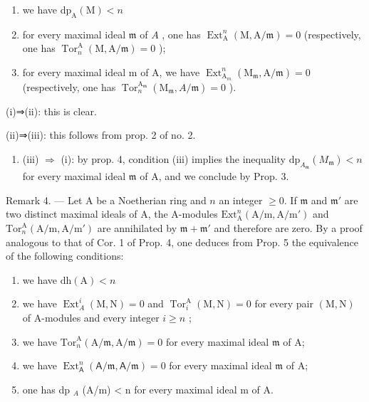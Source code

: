 \begin{enumerate}
\def\labelenumi{(\roman{enumi})}
\item
  we have \(\mathrm{dp}_{\mathrm{A}}(\mathrm{M}) < n\)
\item
  for every maximal ideal \(\mathfrak{m}\) of \(A\) , one has \(\operatorname{Ext}_{\mathrm{A}}^{n}(\mathrm{M},\mathrm{A}/\mathfrak{m}) = 0\) (respectively, one has \(\operatorname{Tor}_{n}^{\mathrm{A}}(\mathrm{M},\mathrm{A}/\mathfrak{m}) = 0\) );
\item
  for every maximal ideal m of A, we have \(\operatorname{Ext}_{\mathrm{A}_{m}}^{n}(\mathrm{M}_{\mathfrak{m}},\mathrm{A}/\mathfrak{m})=0\) (respectively, one has \(\operatorname{Tor}_{n}^{\mathrm{A}_{\mathfrak{m}}}(\mathrm{M}_{\mathfrak{m}},A/\mathfrak{m})=0\) ).
\end{enumerate}

(i)⇒(ii): this is clear.

(ii)⇒(iii): this follows from prop. 2 of no. 2.

\begin{enumerate}
\def\labelenumi{(\roman{enumi})}
\setcounter{enumi}{2}
\tightlist
\item
  (iii) \(\Rightarrow\) (i): by prop. 4, condition (iii) implies the inequality \(\mathrm{dp}_{A_{\mathfrak{m}}}(M_{\mathfrak{m}}) < n\) for every maximal ideal \(\mathfrak{m}\) of A, and we conclude by Prop. 3.
\end{enumerate}

Remark 4. — Let A be a Noetherian ring and \(n\) an integer \(\geqslant 0\). If \(\mathfrak{m}\) and \(\mathfrak{m}'\) are two distinct maximal ideals of A, the A-modules \(\mathrm{Ext}_{\mathrm{A}}^{n}(\mathrm{A/m},\mathrm{A/m}')\) and \(\mathrm{Tor}_{n}^{\mathrm{A}}(\mathrm{A/m},\mathrm{A/m}')\) are annihilated by \(\mathfrak{m} + \mathfrak{m}'\) and therefore are zero. By a proof analogous to that of Cor. 1 of Prop. 4, one deduces from Prop. 5 the equivalence of the following conditions:

\begin{enumerate}
\def\labelenumi{(\roman{enumi})}
\item
  we have \(\mathrm{dh}(\mathrm{A}) < n\)
\item
  we have \(\operatorname{Ext}_A^i (\mathrm{M},\mathrm{N}) = 0\) and \(\operatorname{Tor}_i^{\mathrm{A}}(\mathrm{M},\mathrm{N}) = 0\) for every pair \((\mathrm{M},\mathrm{N})\) of A-modules and every integer \(i\geqslant n\) ;
\item
  we have \(\mathrm{Tor}_n^{\mathrm{A}}(\mathrm{A} / \mathfrak{m},\mathrm{A} / \mathfrak{m}) = 0\) for every maximal ideal \(\mathfrak{m}\) of A;
\item
  we have \(\operatorname{Ext}_{\mathsf{A}}^{n}(\mathsf{A} / \mathfrak{m},\mathsf{A} / \mathfrak{m}) = 0\) for every maximal ideal \(\mathfrak{m}\) of A;
\item
  one has dp \(_{A}\) (A/m) \textless{} n for every maximal ideal m of A.
\end{enumerate}

